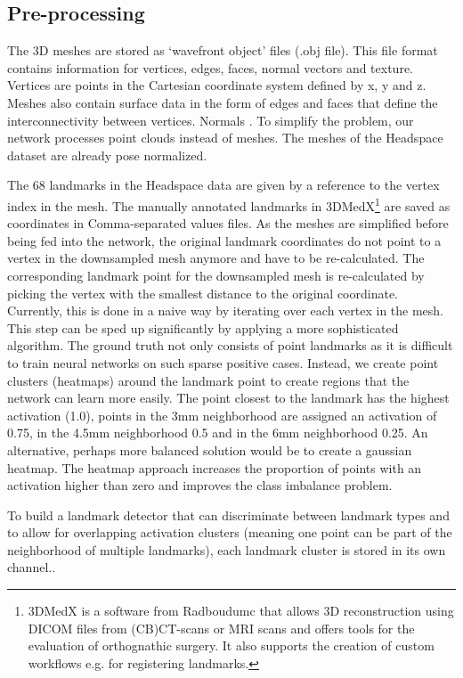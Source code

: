 \documentclass[class=article, crop=false]{standalone}
\begin{document}
\subsection{Pre-processing}
The 3D meshes are stored as ‘wavefront object’ files (.obj file). This  file format contains information for vertices, edges, faces, normal vectors and texture.
Vertices are points in the Cartesian coordinate system defined by x, y and z. Meshes also contain surface data in the form of edges and faces that define the interconnectivity between vertices. Normals \cite{Jong}.
To simplify the problem, our network processes point clouds instead of meshes.
The meshes of the Headspace dataset are already pose normalized.

The 68 landmarks in the Headspace data are given by a reference to the vertex index in the mesh. The manually annotated landmarks in 3DMedX\footnote{3DMedX is a software from Radboudumc that allows 3D reconstruction using DICOM files from (CB)CT-scans or MRI scans and offers tools for the evaluation of orthognathic surgery. It also supports the creation of custom workflows e.g. for registering landmarks.}\cite{3dmedx} are saved as coordinates in Comma-separated values files. As the meshes are simplified before being fed into the network,%
the original landmark coordinates do not point to a vertex in the downsampled mesh anymore and have to be re-calculated. The corresponding landmark point for the downsampled mesh is re-calculated by picking the vertex with the smallest distance to the original coordinate. Currently, this is done in a naive way by iterating over each vertex in the mesh. This step can be sped up significantly by applying a more sophisticated algorithm. The ground truth not only consists of point landmarks as it is difficult to train neural networks on such sparse positive cases. Instead, we create point clusters (heatmaps) around the landmark point to create regions that the network can learn more easily. The point closest to the landmark has the highest activation (1.0), points in the 3mm neighborhood are assigned an activation of 0.75, in the 4.5mm neighborhood 0.5 and in the 6mm neighborhood 0.25. An alternative, perhaps more balanced solution would be to create a gaussian heatmap. The heatmap approach increases the proportion of points with an activation higher than zero and improves the class imbalance problem.

To build a landmark detector that can discriminate between landmark types and to allow for overlapping activation clusters (meaning one point can be part of the neighborhood of multiple landmarks), each landmark cluster is stored in its own channel..
\end{document}
